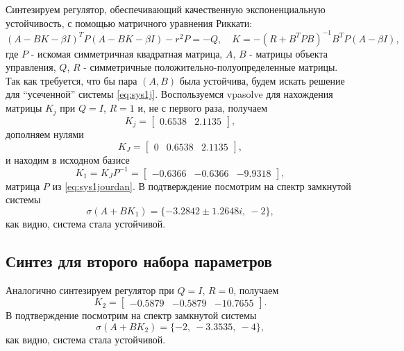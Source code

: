 Синтезируем регулятор, обеспечивающий качественную экспоненциальную 
устойчивость, с помощью матричного уравнения Риккати:
\begin{equation}
    (A-BK-\beta I)^TP(A-BK-\beta I)-r^2P=-Q,\quad K=-(R+B^TPB)^{-1}B^TP(A-\beta I),
    \label{eq:riccal}
\end{equation}
где $P$ -  искомая симметричная квадратная матрица, $A$, $B$ - матрицы объекта управления,
$Q$, $R$ - симметричные положительно-полуопределенные матрицы. Так как требуется,
что бы пара $(A, B)$ была устойчива, будем искать решение для ``усеченной'' 
системы \eqref{eq:sys1j}. Воспользуемся vpasolve для нахождения матрицы $K_j$ 
при $Q=I$, $R=1$ и,
не с первого раза, получаем
\begin{equation*}
    K_j = \begin{bmatrix}
        0.6538& 2.1135
    \end{bmatrix},
\end{equation*}
дополняем нулями
\begin{equation*}
    K_J = \begin{bmatrix}
        0& 0.6538& 2.1135
    \end{bmatrix},
\end{equation*}
и находим в исходном базисе
\begin{equation*}
    K_1=K_JP^{-1}=\begin{bmatrix}
        -0.6366&	-0.6366&	-9.9318
    \end{bmatrix},
\end{equation*}
матрица $P$ из \autoref{eq:sys1jourdan}.
В подтверждение посмотрим на спектр замкнутой системы
\begin{equation*}
    \sigma(A+BK_1)=\{-3.2842 \pm 1.2648i,\ -2 \},
\end{equation*}
как видно, система стала устойчивой. 


\subsection{Синтез для второго набора параметров}

Аналогично синтезируем регулятор при $Q=I$, $R=0$, получаем
\begin{equation*}
    K_2=\begin{bmatrix}
        -0.5879& -0.5879& -10.7655
    \end{bmatrix}.
\end{equation*}
В подтверждение посмотрим на спектр замкнутой системы
\begin{equation*}
    \sigma(A+BK_2)=\{-2,\ -3.3535,\ -4 \},
\end{equation*}
как видно, система стала устойчивой. 


